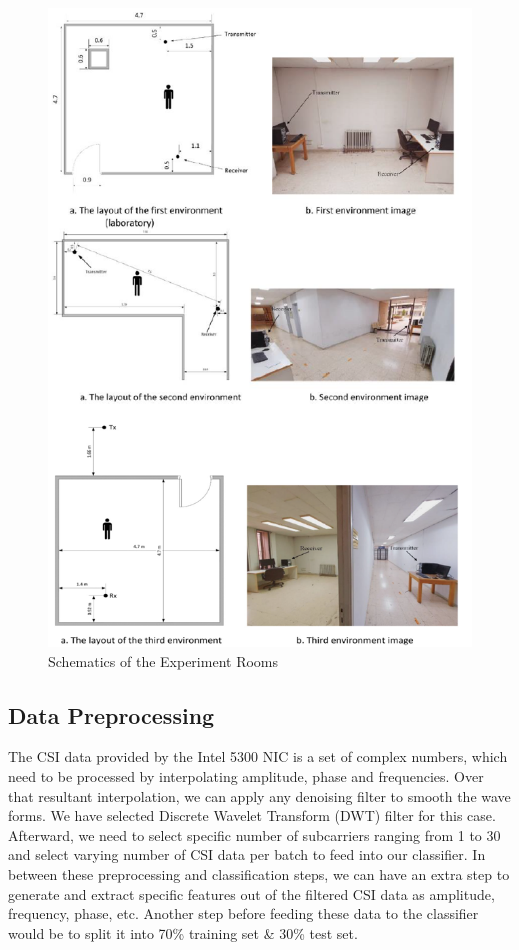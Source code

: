 \documentclass[conference]{IEEEtran}
\begin{document}
\begin{figure}[htbp]
\centerline{\includegraphics[scale=0.5]{images/Room Environment.png}}
\caption{Schematics of the Experiment Rooms}
\label{fig_room_schematics}
\end{figure}

\subsection{Data Preprocessing}
The CSI data provided by the Intel 5300 NIC is a set of complex numbers, which need to be processed by interpolating amplitude, phase and frequencies. Over that resultant interpolation, we can apply any denoising filter to smooth the wave forms. We have selected Discrete Wavelet Transform (DWT) filter for this case. Afterward, we need to select specific number of subcarriers ranging from 1 to 30 and select varying number of CSI data per batch to feed into our classifier. In between these preprocessing and classification steps, we can have an extra step to generate and extract specific features out of the filtered CSI data as amplitude, frequency, phase, etc.
Another step before feeding these data to the classifier would be to split it into 70\% training set \& 30\% test set.
\end{document}
